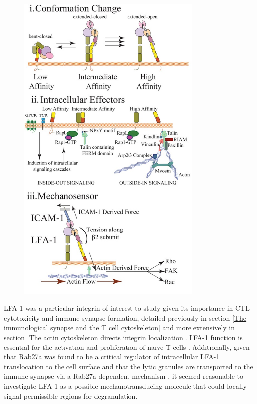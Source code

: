 \begin{figure}[h!]
	\ContinuedFloat
    \centering
    \captionsetup{labelformat=adja-page}
    \includegraphics[width=0.8\textwidth]{../figures/chapter3/lfa.jpg}
    \caption[]{}
\end{figure}

LFA-1 was a particular integrin of interest to study given its importance in CTL cytotoxicity and immune synapse formation, detailed previously in section \ref{The immunological synapse and the T cell cytoskeleton} and more extensively in section \ref{The actin cytoskeleton directs integrin localization}. LFA-1 function is essential for the activation and proliferation of na{\"i}ve T cells \cite{Wang2009, Capece2017}. Additionally, given that Rab27a was found to be a critical regulator of intracellular LFA-1 translocation to the cell surface \cite{Capece2017} and that the lytic granules are transported to the immune synapse via a Rab27a-dependent mechanism \cite{Kurowska2016}, it seemed reasonable to investigate LFA-1 as a possible mechanotransducing molecule that could locally signal permissible regions for degranulation.

